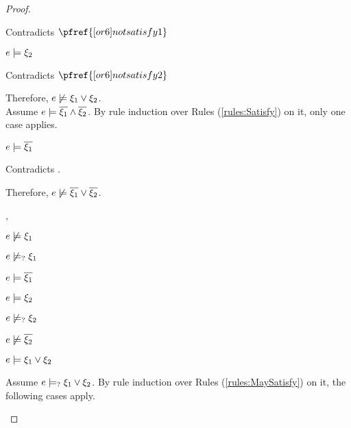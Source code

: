 \begin{proof}
\begin{byCases}
\begin{byCases}
\begin{byCases}
\begin{pfsteps*}
            \end{pfsteps*}
            Contradicts $\pfref{[or6]notsatisfy1}$
        \item[\text{(\ref{rule:CSOr2})}]
            \begin{pfsteps*}
            \item $e \models \xi_2$ 
            \end{pfsteps*}
            Contradicts $\pfref{[or6]notsatisfy2}$
        \end{byCases}
        Therefore, $e \not\models \xi_1 \vee \xi_2$.\\
        Assume $e \models \overline{\xi_1} \wedge \overline{\xi_2}$. By rule induction over Rules (\ref{rules:Satisfy}) on it, only one case applies.
        \begin{byCases}
        \item[\text{(\ref{rule:CSAnd})}]
            \begin{pfsteps*}
            \item $e \models \overline{\xi_1}$ 
            \end{pfsteps*}
            Contradicts .
        \end{byCases}
        Therefore, $e \not\models \overline{\xi_1} \vee \overline{\xi_2}$.
    \item[\csatisfy{e}{\cdual{\xi_1}},\csatisfy{e}{\xi_2}]
        \begin{pfsteps*}
        \item $e \not\models \xi_1$  
        \item $e \not\models_{?} \xi_1$  
        \item $e \models \overline{\xi_1}$  
        \item $e \models \xi_2$  
        \item $e \not\models_{?} \xi_2$  
        \item $e \not\models \overline{\xi_2}$  
        \item $e \models \xi_1 \vee \xi_2$  
        \end{pfsteps*}
        Assume $e \models_{?} \xi_1 \vee \xi_2$. By rule induction over Rules (\ref{rules:MaySatisfy}) on it, the following cases apply.

\end{byCases}
\end{byCases}
\end{proof}
